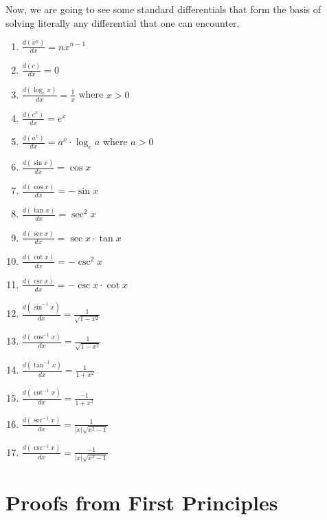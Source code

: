 Now, we are going to see some standard differentials that form the basis of solving literally any differential that one can encounter. 

\begin{enumerate}
    \item $\frac{d\left(x^n\right)}{dx} = nx^{n-1}$
    \item $\frac{d(c)}{dx} = 0$
    \item $\frac{d\left(\log_e x\right)}{dx} = \frac{1}{x}$ where $x > 0$
    \item $\frac{d\left(e^x\right)}{dx} = e^x$
    \item $\frac{d\left(a^x\right)}{dx} = a^x \cdot \log_e a$ where $a > 0$
    \item $\frac{d(\sin x)}{dx} = \cos x$
    \item $\frac{d(\cos x)}{dx} = -\sin x$
    \item $\frac{d(\tan x)}{dx} = \sec^2 x$
    \item $\frac{d(\sec x)}{dx} = \sec x \cdot \tan x$
    \item $\frac{d(\cot x)}{dx} = -\csc^2 x$
    \item $\frac{d(\csc x)}{dx} = -\csc x \cdot \cot x$
    \item $\frac{d\left(\sin^{-1} x\right)}{dx} = \frac{1}{\sqrt{1-x^2}}$
    \item $\frac{d\left(\cos^{-1} x\right)}{dx} = \frac{1}{\sqrt{1-x^2}}$
    \item $\frac{d\left(\tan^{-1} x\right)}{dx} = \frac{1}{1+x^2}$
    \item $\frac{d\left(\cot^{-1} x\right)}{dx} = \frac{-1}{1+x^2}$
    \item $\frac{d\left(\sec^{-1} x\right)}{dx} = \frac{1}{|x| \sqrt{x^2-1}}$
    \item $\frac{d\left(\csc^{-1} x\right)}{dx} = \frac{-1}{|x| \sqrt{x^2-1}}$
\end{enumerate}


\section{Proofs from First Principles}

